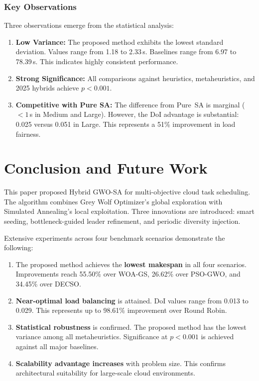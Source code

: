\documentclass[conference]{IEEEtran}
\begin{document}
\subsubsection{Key Observations}
Three observations emerge from the statistical analysis:
\begin{enumerate}
    \item \textbf{Low Variance:} The proposed method exhibits the lowest standard deviation. Values range from 1.18 to 2.33\,s. Baselines range from 6.97 to 78.39\,s. This indicates highly consistent performance.
    \item \textbf{Strong Significance:} All comparisons against heuristics, metaheuristics, and 2025 hybrids achieve $p < 0.001$.
    \item \textbf{Competitive with Pure SA:} The difference from Pure~SA is marginal ($< 1$\,s in Medium and Large). However, the DoI advantage is substantial: 0.025 versus 0.051 in Large. This represents a 51\% improvement in load fairness.
\end{enumerate}


\section{Conclusion and Future Work}

This paper proposed Hybrid GWO-SA for multi-objective cloud task scheduling.
The algorithm combines Grey Wolf Optimizer's global exploration with Simulated Annealing's local exploitation.
Three innovations are introduced: smart seeding, bottleneck-guided leader refinement, and periodic diversity injection.

Extensive experiments across four benchmark scenarios demonstrate the following:
\begin{enumerate}
    \item The proposed method achieves the \textbf{lowest makespan} in all four scenarios. Improvements reach 55.50\% over WOA-GS, 26.62\% over PSO-GWO, and 34.45\% over DECSO.
    \item \textbf{Near-optimal load balancing} is attained. DoI values range from 0.013 to 0.029. This represents up to 98.61\% improvement over Round Robin.
    \item \textbf{Statistical robustness} is confirmed. The proposed method has the lowest variance among all metaheuristics. Significance at $p < 0.001$ is achieved against all major baselines.
    \item \textbf{Scalability advantage increases} with problem size. This confirms architectural suitability for large-scale cloud environments.
\end{enumerate}
\end{document}
